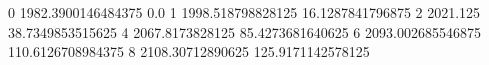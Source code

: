 0 1982.3900146484375 0.0
1 1998.518798828125 16.1287841796875
2 2021.125 38.7349853515625
4 2067.8173828125 85.4273681640625
6 2093.002685546875 110.6126708984375
8 2108.30712890625 125.9171142578125

